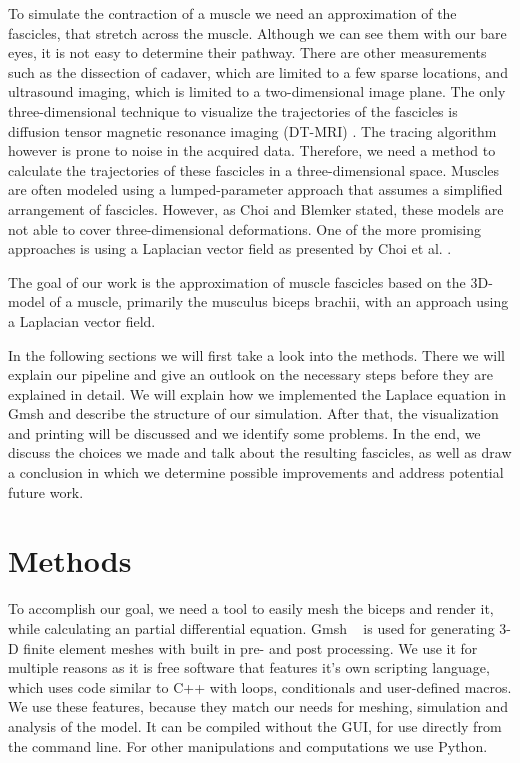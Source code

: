 \documentclass[preprint,journal]{vgtc}       %
\begin{document}
To simulate the contraction of a muscle we need an approximation of the fascicles, that stretch across the muscle. 
Although we can see them with our bare eyes, it is not easy to determine their pathway. 
There are other measurements such as the dissection of cadaver, which are limited to a few sparse locations, and ultrasound imaging, which is limited to a two-dimensional image plane.
The only three-dimensional technique to visualize the trajectories of the fascicles is diffusion tensor magnetic resonance imaging (DT-MRI) \cite{Choi2013}.
The tracing algorithm however is prone to noise in the acquired data.
Therefore, we need a method to calculate the trajectories of these fascicles in a three-dimensional space.
Muscles are often modeled using a lumped-parameter approach that assumes a simplified arrangement of fascicles. 
However, as Choi and Blemker \cite{Choi2013} stated, these models are not able to cover three-dimensional deformations.
One of the more promising approaches is using a Laplacian vector field as presented by Choi et al. \cite{Choi2013}. 

The goal of our work is the approximation of muscle fascicles based on the 3D-model of a muscle, primarily the musculus biceps brachii, with an approach using a Laplacian vector field. 

In the following sections we will first take a look into the methods. 
There we will explain our pipeline and give an outlook on the necessary steps before they are explained in detail. 
We will explain how we implemented the Laplace equation in Gmsh and describe the structure of our simulation. 
After that, the visualization and printing will be discussed and we identify some problems. 
In the end, we discuss the choices we made and talk about the resulting fascicles, as well as draw a conclusion in which we determine possible improvements and address potential future work.

%
%
%
\section{Methods}

To accomplish our goal, we need a tool to easily mesh the biceps and render it, while calculating an partial differential equation. 
Gmsh ~\cite{Geuzaine2009} is used for generating 3-D finite element meshes with built in pre- and post processing. 
We use it for multiple reasons as it is free software that features it's own scripting language, which uses code similar to C++ with loops, conditionals and user-defined macros.
We use these features, because they match our needs for meshing, simulation and analysis of the model. 
It can be compiled without the GUI, for use directly from the command line. 
For other manipulations and computations we use Python.
\end{document}
